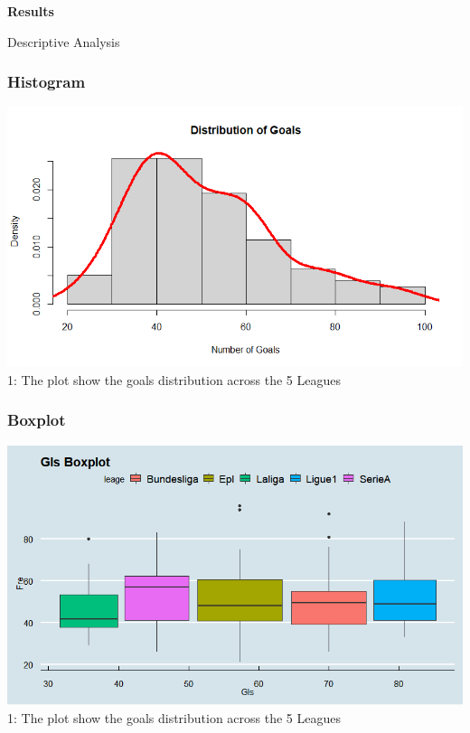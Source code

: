 \documentclass[11pt]{beamer}
\begin{document}
\begin{frame}
\color{blue}
    \begin{center}
        \Huge\textbf{Results}
    \end{center}
	\end{frame}
\begin{frame}{Descriptive Analysis}


	\frametitle{Histogram}
	\includegraphics[scale=0.5]{gls1}\\
		\figurename 1: The plot show the goals distribution across the 5 Leagues
	\end{frame}
 \begin{frame}
	\frametitle{Boxplot}
	\includegraphics[scale=0.5]{Gls}\\
	\figurename 1: The plot show the goals distribution across the 5 Leagues
\end{frame}
\end{document}
